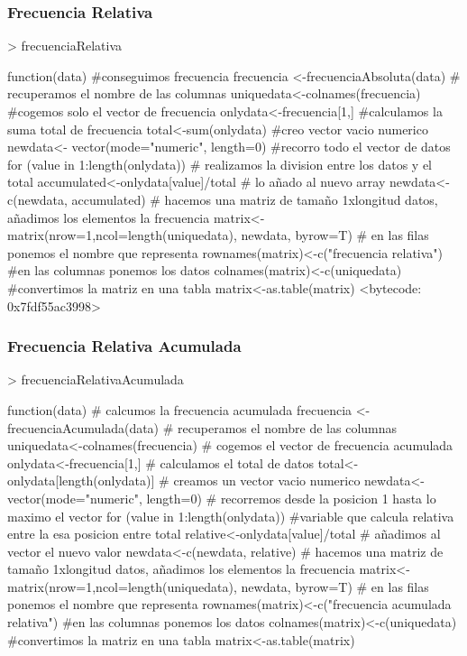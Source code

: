 \documentclass [a4paper] {article}
\begin{document}
\subsubsection{Frecuencia Relativa}
\begin{Schunk}
\begin{Sinput}
> frecuenciaRelativa
\end{Sinput}
\begin{Soutput}
function(data){
    #conseguimos frecuencia
    frecuencia <-frecuenciaAbsoluta(data)
    # recuperamos el nombre de las columnas
    uniquedata<-colnames(frecuencia)
    #cogemos solo el vector de frecuencia
    onlydata<-frecuencia[1,]
    #calculamos la suma total de frecuencia
    total<-sum(onlydata)
    #creo vector vacio numerico
    newdata<- vector(mode="numeric", length=0)
    #recorro todo el vector de datos
    for (value in 1:length(onlydata)) {
        # realizamos la division entre los datos y el total
        accumulated<-onlydata[value]/total
        # lo añado al nuevo array
        newdata<-c(newdata, accumulated)
    }
    # hacemos una matriz de tamaño 1xlongitud datos, añadimos los elementos la frecuencia
  matrix<-matrix(nrow=1,ncol=length(uniquedata), newdata, byrow=T)
  # en las filas ponemos el nombre que representa
  rownames(matrix)<-c("frecuencia relativa")
  #en las columnas ponemos los datos
  colnames(matrix)<-c(uniquedata)
  #convertimos la matriz en una tabla
  matrix<-as.table(matrix)
}
<bytecode: 0x7fdf55ac3998>
\end{Soutput}
\end{Schunk}
\subsubsection{Frecuencia Relativa Acumulada}
\begin{Schunk}
\begin{Sinput}
> frecuenciaRelativaAcumulada
\end{Sinput}
\begin{Soutput}
function(data){
    # calcumos la frecuencia acumulada
    frecuencia <-frecuenciaAcumulada(data)
    # recuperamos el nombre de las columnas
    uniquedata<-colnames(frecuencia)
    # cogemos el vector de frecuencia acumulada
    onlydata<-frecuencia[1,]
    # calculamos el total de datos 
    total<-onlydata[length(onlydata)]
    # creamos un vector vacio numerico
    newdata<- vector(mode="numeric", length=0)
    # recorremos desde la posicion 1 hasta lo maximo el vector
    for (value in 1:length(onlydata)) {
        #variable que calcula relativa entre la esa posicion entre total 
        relative<-onlydata[value]/total
        # añadimos al vector el nuevo valor
        newdata<-c(newdata, relative)
    }
    # hacemos una matriz de tamaño 1xlongitud datos, añadimos los elementos la frecuencia
  matrix<-matrix(nrow=1,ncol=length(uniquedata), newdata, byrow=T)
  # en las filas ponemos el nombre que representa
  rownames(matrix)<-c("frecuencia acumulada relativa")
  #en las columnas ponemos los datos
  colnames(matrix)<-c(uniquedata)
  #convertimos la matriz en una tabla
  matrix<-as.table(matrix)
}
\end{Soutput}
\end{Schunk}
\end{document}
